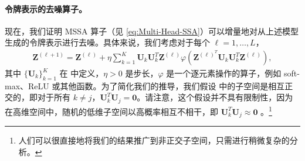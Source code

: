 \documentclass[../../book-main.tex]{subfiles}
\begin{document}
\paragraph{令牌表示的去噪算子。} 现在，我们证明 MSSA 算子（见 \eqref{eq:Multi-Head-SSA}）可以增量地对从上述模型生成的令牌表示进行去噪。具体来说，我们考虑对于每个 $\ell =1 ,\dots,L$，
\begin{align}\label{eq:MSSA}
    \bm Z^{(\ell+1)} =  \bm Z^{(\ell)} + \eta \sum_{k=1}^K \bm U_k\bm U_k^T \bm Z^{(\ell)} \varphi \left(\bm Z^{(\ell)^T}\bm U_k\bm U_k^T\bm Z^{(\ell)} \right),
\end{align}
其中 $\{\bm U_k\}_{k=1}^K$ 在  中定义，$\eta > 0$ 是步长，$\varphi$ 是一个逐元素操作的算子，例如 soft-max、ReLU 或其他函数。为了简化我们的推导，我们假设  中的子空间是相互正交的，即对于所有 $k \neq j$，$\bm U_k^T\bm U_j = \bm 0$。请注意，这个假设并不具有限制性，因为在高维空间中，随机的低维子空间以高概率相互不相干，即 $\bm U_k^T\bm U_j \approx \bm 0$ \citep{Wright-Ma-2021}。\footnote{人们可以很直接地将我们的结果推广到非正交子空间，只需进行稍微复杂的分析。}
\end{document}

